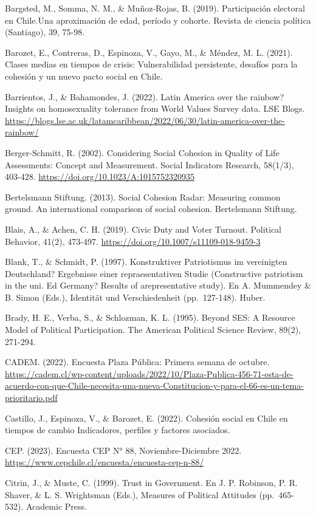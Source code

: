 \documentclass[
  12pt,
]{book}
\begin{document}
Bargsted, M., Somma, N. M., \& Muñoz-Rojas, B. (2019). Participación electoral en Chile.Una aproximación de edad, período y cohorte. Revista de ciencia política (Santiago), 39, 75-98.

Barozet, E., Contreras, D., Espinoza, V., Gayo, M., \& Méndez, M. L. (2021). Clases medias en tiempos de crisis: Vulnerabilidad persistente, desafíos para la cohesión y un nuevo pacto social en Chile.

Barrientos, J., \& Bahamondes, J. (2022). Latin America over the rainbow? Insights on homosexuality tolerance from World Values Survey data. LSE Blogs. \url{https://blogs.lse.ac.uk/latamcaribbean/2022/06/30/latin-america-over-the-rainbow/}

Berger-Schmitt, R. (2002). Considering Social Cohesion in Quality of Life Assessments: Concept and Measurement. Social Indicators Research, 58(1/3), 403-428. \url{https://doi.org/10.1023/A:1015752320935}

Bertelsmann Stiftung. (2013). Social Cohesion Radar: Measuring common ground. An international comparison of social cohesion. Bertelsmann Stiftung.

Blais, A., \& Achen, C. H. (2019). Civic Duty and Voter Turnout. Political Behavior, 41(2), 473-497. \url{https://doi.org/10.1007/s11109-018-9459-3}

Blank, T., \& Schmidt, P. (1997). Konstruktiver Patriotismus im vereinigten Deutschland? Ergebnisse einer repraesentativen Studie (Constructive patriotism in the uni. Ed Germany? Results of arepresentative study). En A. Mummendey \& B. Simon (Eds.), Identität und Verschiedenheit (pp.~127-148). Huber.

Brady, H. E., Verba, S., \& Schlozman, K. L. (1995). Beyond SES: A Resource Model of Political Participation. The American Political Science Review, 89(2), 271-294.

CADEM. (2022). Encuesta Plaza Pública: Primera semana de octubre. \url{https://cadem.cl/wp-content/uploads/2022/10/Plaza-Publica-456-71-esta-de-acuerdo-con-que-Chile-necesita-una-nueva-Constitucion-y-para-el-66-es-un-tema-prioritario.pdf}

Castillo, J., Espinoza, V., \& Barozet, E. (2022). Cohesión social en Chile en tiempos de cambio Indicadores, perfiles y factores asociados.

CEP. (2023). Encuesta CEP N° 88, Noviembre-Diciembre 2022. \url{https://www.cepchile.cl/encuesta/encuesta-cep-n-88/}

Citrin, J., \& Muste, C. (1999). Trust in Government. En J. P. Robinson, P. R. Shaver, \& L. S. Wrightsman (Eds.), Measures of Political Attitudes (pp.~465-532). Academic Press.
\end{document}
